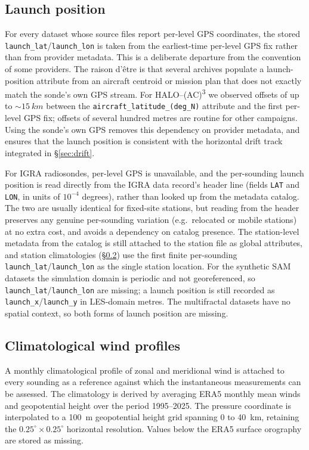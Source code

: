 \documentclass[11pt]{article}
\begin{document}
\subsection{Launch position} \label{sec:launch}

For every dataset whose source files report per-level GPS coordinates, the stored \texttt{launch\_lat}/\texttt{launch\_lon} is taken from the earliest-time per-level GPS fix rather than from provider metadata.  This is a deliberate departure from the convention of some providers.  The raison d'\^etre is that several archives populate a launch-position attribute from an aircraft centroid or mission plan that does not exactly match the sonde's own GPS stream.  For HALO--(AC)\textsuperscript{3} we observed offsets of up to ${\sim}\SI{15}{km}$ between the \texttt{aircraft\_latitude\_(deg\_N)} attribute and the first per-level GPS fix; offsets of several hundred metres are routine for other campaigns.  Using the sonde's own GPS removes this dependency on provider metadata, and ensures that the launch position is consistent with the horizontal drift track integrated in \S\ref{sec:drift}.

For IGRA radiosondes, per-level GPS is unavailable, and the per-sounding launch position is read directly from the IGRA data record's header line (fields \texttt{LAT} and \texttt{LON}, in units of $10^{-4}$ degrees), rather than looked up from the metadata catalog.  The two are usually identical for fixed-site stations, but reading from the header preserves any genuine per-sounding variation (e.g.\ relocated or mobile stations) at no extra cost, and avoids a dependency on catalog presence.  The station-level metadata from the catalog is still attached to the station file as global attributes, and station climatologies (\S\ref{sec:clim}) use the first finite per-sounding \texttt{launch\_lat}/\texttt{launch\_lon} as the single station location.  For the synthetic SAM datasets the simulation domain is periodic and not georeferenced, so \texttt{launch\_lat}/\texttt{launch\_lon} are missing; a launch position is still recorded as \texttt{launch\_x}/\texttt{launch\_y} in LES-domain metres.  The multifractal datasets have no spatial context, so both forms of launch position are missing.

\subsection{Climatological wind profiles} \label{sec:clim}

A monthly climatological profile of zonal and meridional wind is attached to every sounding as a reference against which the instantaneous measurements can be assessed.  The climatology is derived by averaging ERA5 monthly mean winds and geopotential height over the period 1995--2025. The pressure coordinate is interpolated to a \SI{100}{m} geopotential height grid spanning 0 to \SI{40}{km}, retaining the $0.25^\circ\times 0.25^\circ$ horizontal resolution. Values below the ERA5 surface orography are stored as missing.
\end{document}
